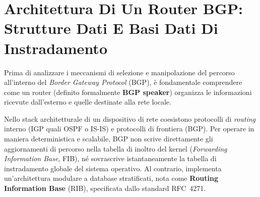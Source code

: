 \documentclass[11pt, a4paper]{article}
\begin{document}


\section{Architettura Di Un Router BGP: Strutture Dati E Basi Dati Di Instradamento}

Prima di analizzare i meccanismi di selezione e manipolazione del percorso all'interno del \emph{Border Gateway Protocol} (BGP), è fondamentale comprendere come un router (definito formalmente \textbf{BGP speaker}) organizza le informazioni ricevute dall'esterno e quelle destinate alla rete locale.

Nello stack architetturale di un dispositivo di rete coesistono protocolli di \emph{routing} interno (IGP quali OSPF o IS-IS) e protocolli di frontiera (BGP). Per operare in maniera deterministica e scalabile, BGP non scrive direttamente gli aggiornamenti di percorso nella tabella di inoltro del kernel (\emph{Forwarding Information Base}, FIB), né sovrascrive istantaneamente la tabella di instradamento globale del sistema operativo. Al contrario, implementa un'architettura modulare a database stratificati, nota come \textbf{Routing Information Base} (RIB), specificata dallo standard RFC~4271.

\end{document}
